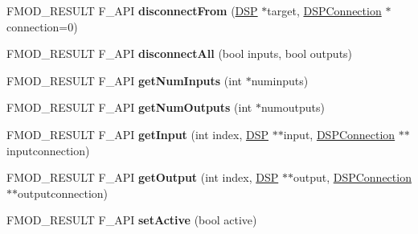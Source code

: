 \begin{DoxyCompactItemize}
\item 
\hypertarget{class_f_m_o_d_1_1_d_s_p_aecd8d581ef5bfc1c04b8b5859b7920f8}{F\+M\+O\+D\+\_\+\+R\+E\+S\+U\+L\+T F\+\_\+\+A\+P\+I {\bfseries disconnect\+From} (\hyperlink{class_f_m_o_d_1_1_d_s_p}{D\+S\+P} $\ast$target, \hyperlink{class_f_m_o_d_1_1_d_s_p_connection}{D\+S\+P\+Connection} $\ast$connection=0)}\label{class_f_m_o_d_1_1_d_s_p_aecd8d581ef5bfc1c04b8b5859b7920f8}

\item 
\hypertarget{class_f_m_o_d_1_1_d_s_p_a3eb9cfc992a069357bbebeafffad9c8e}{F\+M\+O\+D\+\_\+\+R\+E\+S\+U\+L\+T F\+\_\+\+A\+P\+I {\bfseries disconnect\+All} (bool inputs, bool outputs)}\label{class_f_m_o_d_1_1_d_s_p_a3eb9cfc992a069357bbebeafffad9c8e}

\item 
\hypertarget{class_f_m_o_d_1_1_d_s_p_a20667543975afbb53cc19a1389bfd6e7}{F\+M\+O\+D\+\_\+\+R\+E\+S\+U\+L\+T F\+\_\+\+A\+P\+I {\bfseries get\+Num\+Inputs} (int $\ast$numinputs)}\label{class_f_m_o_d_1_1_d_s_p_a20667543975afbb53cc19a1389bfd6e7}

\item 
\hypertarget{class_f_m_o_d_1_1_d_s_p_a26bcf3c3560fae9e15db4ea1a39d21e3}{F\+M\+O\+D\+\_\+\+R\+E\+S\+U\+L\+T F\+\_\+\+A\+P\+I {\bfseries get\+Num\+Outputs} (int $\ast$numoutputs)}\label{class_f_m_o_d_1_1_d_s_p_a26bcf3c3560fae9e15db4ea1a39d21e3}

\item 
\hypertarget{class_f_m_o_d_1_1_d_s_p_adebf041723376a94c176edf0126c8321}{F\+M\+O\+D\+\_\+\+R\+E\+S\+U\+L\+T F\+\_\+\+A\+P\+I {\bfseries get\+Input} (int index, \hyperlink{class_f_m_o_d_1_1_d_s_p}{D\+S\+P} $\ast$$\ast$input, \hyperlink{class_f_m_o_d_1_1_d_s_p_connection}{D\+S\+P\+Connection} $\ast$$\ast$inputconnection)}\label{class_f_m_o_d_1_1_d_s_p_adebf041723376a94c176edf0126c8321}

\item 
\hypertarget{class_f_m_o_d_1_1_d_s_p_a13584fc2ef78192b375ca6d117a49560}{F\+M\+O\+D\+\_\+\+R\+E\+S\+U\+L\+T F\+\_\+\+A\+P\+I {\bfseries get\+Output} (int index, \hyperlink{class_f_m_o_d_1_1_d_s_p}{D\+S\+P} $\ast$$\ast$output, \hyperlink{class_f_m_o_d_1_1_d_s_p_connection}{D\+S\+P\+Connection} $\ast$$\ast$outputconnection)}\label{class_f_m_o_d_1_1_d_s_p_a13584fc2ef78192b375ca6d117a49560}

\item 
\hypertarget{class_f_m_o_d_1_1_d_s_p_ab85ee53bebfd6fc3cccb9979cf13eaba}{F\+M\+O\+D\+\_\+\+R\+E\+S\+U\+L\+T F\+\_\+\+A\+P\+I {\bfseries set\+Active} (bool active)}\label{class_f_m_o_d_1_1_d_s_p_ab85ee53bebfd6fc3cccb9979cf13eaba}


\end{DoxyCompactItemize}
